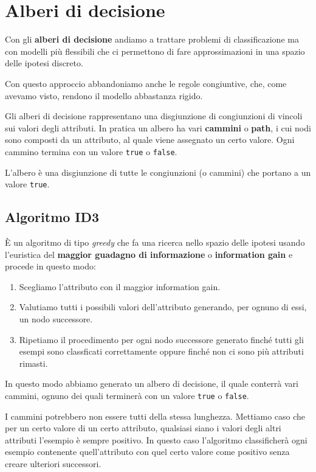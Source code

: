 \chapter{Alberi di decisione}
Con gli \textbf{alberi di decisione} andiamo a trattare problemi di classificazione ma con modelli pi\`u flessibili
che ci permettono di fare approssimazioni in una spazio delle ipotesi discreto.

Con questo approccio abbandoniamo anche le regole congiuntive, che, come avevamo visto, rendono il modello abbastanza
rigido.

Gli alberi di decisione rappresentano una disgiunzione di congiunzioni di vincoli sui valori degli attributi. In
pratica un albero ha vari \textbf{cammini} o \textbf{path}, i cui nodi sono composti da un attributo, al
quale viene assegnato un certo valore. Ogni cammino termina con un valore \verb|true| o \verb|false|.

L'albero \`e una disgiunzione di tutte le congiunzioni (o cammini) che portano a un valore \verb|true|.

\section{Algoritmo ID3}
\`E un algoritmo di tipo \emph{greedy} che fa una ricerca nello spazio delle ipotesi usando l'euristica del
\textbf{maggior guadagno di informazione} o \textbf{information gain} e procede in questo modo:
\begin{enumerate}
	\item Scegliamo l'attributo con il maggior information gain.
	\item Valutiamo tutti i possibili valori dell'attributo generando, per ognuno di essi, un nodo successore.
	\item Ripetiamo il procedimento per ogni nodo successore generato finch\'e tutti gli esempi sono classficati
	      correttamente oppure finch\'e non ci sono pi\`u attributi rimasti.
\end{enumerate}
In questo modo abbiamo generato un albero di decisione, il quale conterr\`a vari cammini, ognuno dei quali terminer\`a
con un valore \verb|true| o \verb|false|.

I cammini potrebbero non essere tutti della stessa lunghezza. Mettiamo caso che per un certo valore di un certo
attributo, qualsiasi siano i valori degli altri attributi l'esempio \`e sempre positivo. In questo caso l'algoritmo
classificher\`a ogni esempio contenente quell'attributo con quel certo valore come positivo senza creare ulteriori
successori.

